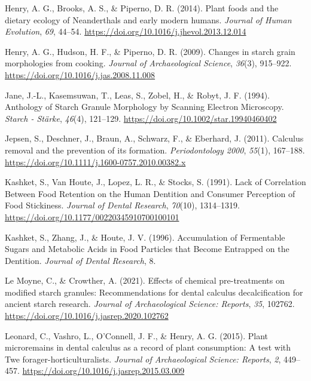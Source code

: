 \documentclass[
  letterpaper,
]{book}
\newlength{\cslhangindent}
\newlength{\cslentryspacingunit} %
\newenvironment{CSLReferences}[2] %
 {%
  \setlength{\parindent}{0pt}
  \ifodd #1
  \let\oldpar\par
  \def\par{\hangindent=\cslhangindent\oldpar}
  \fi
  \setlength{\parskip}{#2\cslentryspacingunit}
 }%
 {}
\begin{document}
\begin{CSLReferences}{1}{0}
\leavevmode{}%
Henry, A. G., Brooks, A. S., \& Piperno, D. R. (2014). Plant foods and
the dietary ecology of {Neanderthals} and early modern humans.
\emph{Journal of Human Evolution}, \emph{69}, 44--54.
\url{https://doi.org/10.1016/j.jhevol.2013.12.014}

\leavevmode{}%
Henry, A. G., Hudson, H. F., \& Piperno, D. R. (2009). Changes in starch
grain morphologies from cooking. \emph{Journal of Archaeological
Science}, \emph{36}(3), 915--922.
\url{https://doi.org/10.1016/j.jas.2008.11.008}

\leavevmode{}%
Jane, J.-L., Kasemsuwan, T., Leas, S., Zobel, H., \& Robyt, J. F.
(1994). Anthology of {Starch Granule Morphology} by {Scanning Electron
Microscopy}. \emph{Starch - Stärke}, \emph{46}(4), 121--129.
\url{https://doi.org/10.1002/star.19940460402}

\leavevmode{}%
Jepsen, S., Deschner, J., Braun, A., Schwarz, F., \& Eberhard, J.
(2011). Calculus removal and the prevention of its formation.
\emph{Periodontology 2000}, \emph{55}(1), 167--188.
\url{https://doi.org/10.1111/j.1600-0757.2010.00382.x}

\leavevmode{}%
Kashket, S., Van Houte, J., Lopez, L. R., \& Stocks, S. (1991). Lack of
{Correlation Between Food Retention} on the {Human Dentition} and
{Consumer Perception} of {Food Stickiness}. \emph{Journal of Dental
Research}, \emph{70}(10), 1314--1319.
\url{https://doi.org/10.1177/00220345910700100101}

\leavevmode{}%
Kashket, S., Zhang, J., \& Houte, J. V. (1996). Accumulation of
{Fermentable Sugars} and {Metabolic Acids} in {Food Particles} that
{Become Entrapped} on the {Dentition}. \emph{Journal of Dental
Research}, 8.

\leavevmode{}%
Le Moyne, C., \& Crowther, A. (2021). Effects of chemical pre-treatments
on modified starch granules: {Recommendations} for dental calculus
decalcification for ancient starch research. \emph{Journal of
Archaeological Science: Reports}, \emph{35}, 102762.
\url{https://doi.org/10.1016/j.jasrep.2020.102762}

\leavevmode{}%
Leonard, C., Vashro, L., O'Connell, J. F., \& Henry, A. G. (2015). Plant
microremains in dental calculus as a record of plant consumption: {A}
test with {Twe} forager-horticulturalists. \emph{Journal of
Archaeological Science: Reports}, \emph{2}, 449--457.
\url{https://doi.org/10.1016/j.jasrep.2015.03.009}


\end{CSLReferences}
\end{document}
